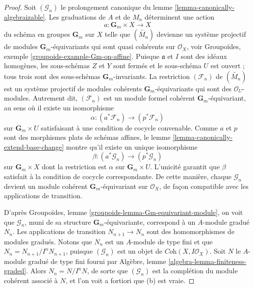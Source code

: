 \begin{proof}
Soit $(\mathcal{G}_n)$ le prolongement canonique du
lemme \ref{lemma-canonically-algebraizable}.
Les graduations de $A$ et de $M_n$ déterminent une action
$$
a : \mathbf{G}_m \times X \longrightarrow X
$$
du schéma en groupes $\mathbf{G}_m$ sur $X$ telle que
$(\widetilde{M_n})$ devienne un système projectif de
modules $\mathbf{G}_m$-équivariants qui sont quasi cohérents sur $\mathcal{O}_X$, voir
Groupoïdes, exemple \ref{groupoids-example-Gm-on-affine}.
Puisque $\mathfrak a$ et $I$ sont des idéaux homogènes,
les sous-schémas $Z$ et $Y$ sont fermés et le sous-schéma $U$ est ouvert ;
tous trois sont des sous-schémas $\mathbf{G}_m$-invariants.
La restriction $(\mathcal{F}_n)$ de $(\widetilde{M_n})$
est un système projectif de modules cohérents $\mathbf{G}_m$-équivariants
qui sont des $\mathcal{O}_U$-modules. Autrement dit, $(\mathcal{F}_n)$
est un module formel cohérent $\mathbf{G}_m$-équivariant,
au sens où il existe un isomorphisme
$$
\alpha : (a^*\mathcal{F}_n) \longrightarrow (p^*\mathcal{F}_n)
$$
sur $\mathbf{G}_m \times U$ satisfaisant à une condition de cocycle convenable.
Comme $a$ et $p$ sont des morphismes plats de schémas affines,
le lemme \ref{lemma-canonically-extend-base-change}
montre qu'il existe un unique isomorphisme
$$
\beta : (a^*\mathcal{G}_n) \longrightarrow (p^*\mathcal{G}_n)
$$
sur $\mathbf{G}_m \times X$ dont la restriction est $\alpha$ sur
$\mathbf{G}_m \times U$. L'unicité garantit que
$\beta$ satisfait à la condition de cocycle correspondante.
De cette manière, chaque $\mathcal{G}_n$ devient
un module cohérent $\mathbf{G}_m$-équivariant sur $\mathcal{O}_X$,
de façon compatible avec les applications de transition.

\medskip\noindent
D'après Groupoïdes, lemme \ref{groupoids-lemma-Gm-equivariant-module},
on voit que $\mathcal{G}_n$, muni de sa structure $\mathbf{G}_m$-équivariante,
correspond à un $A$-module gradué $N_n$. Les applications de transition
$N_{n + 1} \to N_n$ sont des homomorphismes de modules gradués. Notons que $N_n$ est un
$A$-module de type fini et que $N_n = N_{n + 1}/I^n N_{n + 1}$, puisque
$(\mathcal{G}_n)$ est un objet de $\textit{Coh}(X, I\mathcal{O}_X)$.
Soit $N$ le $A$-module gradué de type fini fourni par
Algèbre, lemme \ref{algebra-lemma-finiteness-graded}.
Alors $N_n = N/I^nN$, de sorte que $(\mathcal{G}_n)$
est la complétion du module cohérent
associé à $N$, et l'on voit a fortiori que (b) est vraie.


\end{proof}
